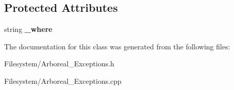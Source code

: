 \subsection*{Protected Attributes}
\begin{DoxyCompactItemize}
\item 
\mbox{\label{classarboreal__runtime__error_afca0adf6a259600843b6975591e0bde4}} 
string {\bfseries \+\_\+where}
\end{DoxyCompactItemize}


The documentation for this class was generated from the following files\+:\begin{DoxyCompactItemize}
\item 
Filesystem/Arboreal\+\_\+\+Exceptions.\+h\item 
Filesystem/Arboreal\+\_\+\+Exceptions.\+cpp\end{DoxyCompactItemize}
